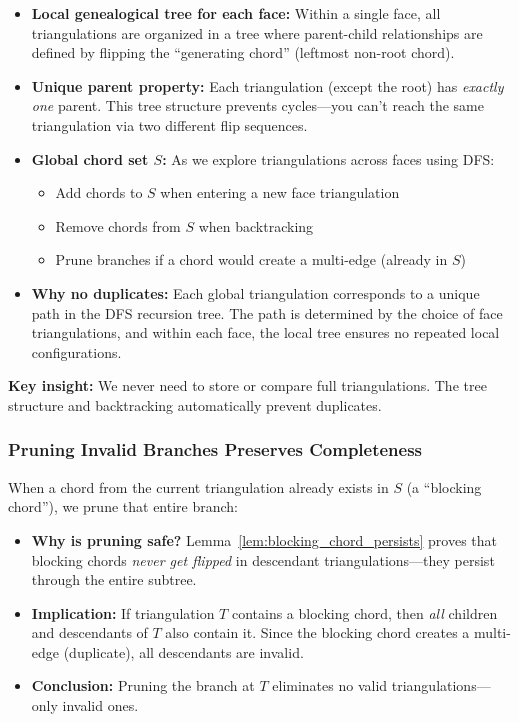 \documentclass[12pt,a4paper]{article}
\theoremstyle{definition}
\theoremstyle{remark}
\begin{document}
\begin{itemize}
    \item \textbf{Local genealogical tree for each face:} Within a single face, all triangulations are organized in a tree where parent-child relationships are defined by flipping the ``generating chord'' (leftmost non-root chord).
    
    \item \textbf{Unique parent property:} Each triangulation (except the root) has \emph{exactly one} parent. This tree structure prevents cycles---you can't reach the same triangulation via two different flip sequences.
    
    \item \textbf{Global chord set $S$:} As we explore triangulations across faces using DFS:
    \begin{itemize}
        \item Add chords to $S$ when entering a new face triangulation
        \item Remove chords from $S$ when backtracking
        \item Prune branches if a chord would create a multi-edge (already in $S$)
    \end{itemize}
    
    \item \textbf{Why no duplicates:} Each global triangulation corresponds to a unique path in the DFS recursion tree. The path is determined by the choice of face triangulations, and within each face, the local tree ensures no repeated local configurations.
\end{itemize}

\textbf{Key insight:} We never need to store or compare full triangulations. The tree structure and backtracking automatically prevent duplicates.

\subsubsection{Pruning Invalid Branches Preserves Completeness}

When a chord from the current triangulation already exists in $S$ (a ``blocking chord''), we prune that entire branch:

\begin{itemize}
    \item \textbf{Why is pruning safe?} Lemma~\ref{lem:blocking_chord_persists} proves that blocking chords \emph{never get flipped} in descendant triangulations---they persist through the entire subtree.
    
    \item \textbf{Implication:} If triangulation $T$ contains a blocking chord, then \emph{all} children and descendants of $T$ also contain it. Since the blocking chord creates a multi-edge (duplicate), all descendants are invalid.
    
    \item \textbf{Conclusion:} Pruning the branch at $T$ eliminates no valid triangulations---only invalid ones.
\end{itemize}
\end{document}
